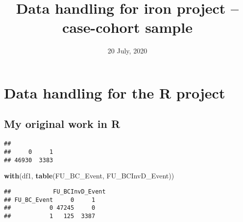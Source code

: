 \documentclass[
]{article}
\title{Data handling for iron project -- case-cohort sample}
\date{20 July, 2020}
\newenvironment{Shaded}{\begin{snugshade}}{\end{snugshade}}
\newcommand{\CommentTok}[1]{\textcolor[rgb]{0.56,0.35,0.01}{\textit{#1}}}
\newcommand{\DataTypeTok}[1]{\textcolor[rgb]{0.13,0.29,0.53}{#1}}
\newcommand{\KeywordTok}[1]{\textcolor[rgb]{0.13,0.29,0.53}{\textbf{#1}}}
\newcommand{\NormalTok}[1]{#1}
\newcommand{\OperatorTok}[1]{\textcolor[rgb]{0.81,0.36,0.00}{\textbf{#1}}}
\newcommand{\StringTok}[1]{\textcolor[rgb]{0.31,0.60,0.02}{#1}}
\begin{document}
\maketitle

{
\hypersetup{linkcolor=}
\setcounter{tocdepth}{3}
\tableofcontents
}
\hypertarget{data-handling-for-the-r-project}{%
\section{Data handling for the R
project}\label{data-handling-for-the-r-project}}

\hypertarget{my-original-work-in-r}{%
\subsection{My original work in R}\label{my-original-work-in-r}}

\begin{Shaded}
\end{Shaded}

\begin{verbatim}
## 
##     0     1 
## 46930  3383
\end{verbatim}

\begin{Shaded}
\begin{Highlighting}[]
\KeywordTok{with}\NormalTok{(df1, }\KeywordTok{table}\NormalTok{(FU_BC_Event, FU_BCInvD_Event))}
\end{Highlighting}
\end{Shaded}

\begin{verbatim}
##            FU_BCInvD_Event
## FU_BC_Event     0     1
##           0 47245     0
##           1   125  3387
\end{verbatim}
\end{document}
